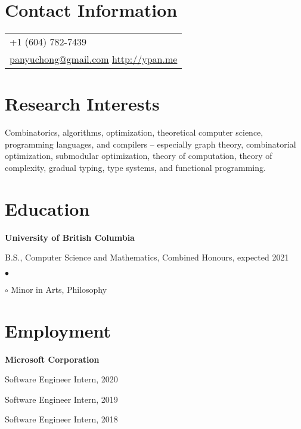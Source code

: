 \documentclass[margin,line]{res}
\newenvironment{list1}{
  \begin{list}{\ding{113}}{%
      \setlength{\itemsep}{0in}
      \setlength{\parsep}{0.025in} \setlength{\parskip}{0in}
      \setlength{\topsep}{0in} \setlength{\partopsep}{0in}
      \setlength{\leftmargin}{0.17in}}}{\end{list}}
\newenvironment{list2}{
  \begin{list}{$\bullet$}{%
      \setlength{\itemsep}{0in}
      \setlength{\parsep}{0in} \setlength{\parskip}{0in}
      \setlength{\topsep}{0in} \setlength{\partopsep}{0in}
      \setlength{\leftmargin}{0.2in}}}{\end{list}}
\begin{document}

\begin{resume}

\section{\sc Contact Information}

\vspace{.05in}
\begin{tabular}{p{2in}}
+1 (604) 782-7439 \\
\href{mailto:panyuchong@gmail.com}{panyuchong@gmail.com}
\href{http://ypan.me/}{http://ypan.me}
\end{tabular}


\section{\sc Research Interests}
Combinatorics, algorithms, optimization, theoretical computer science, programming languages, and compilers -- especially graph theory, combinatorial optimization, submodular optimization, theory of computation, theory of complexity, gradual typing, type systems, and functional programming.

\section{\sc Education}

{\bf University of British Columbia}\\
\vspace*{-.1in}
\begin{list1}
\item[] B.S., Computer Science and Mathematics, Combined Honours, expected 2021
  \begin{list2}
  \item[$\circ$] Minor in Arts, Philosophy
  \end{list2}
\end{list1}


\section{\sc Employment}

{\bf Microsoft Corporation}\\
\vspace*{-.1in}
\begin{list1}
\item[] Software Engineer Intern, 2020
\item[] Software Engineer Intern, 2019
\item[] Software Engineer Intern, 2018
\end{list1}


\end{resume}
\end{document}
